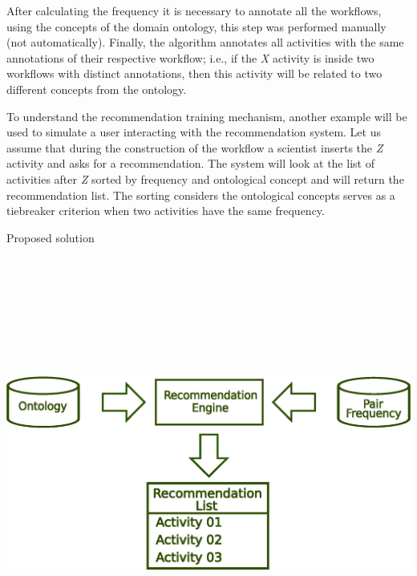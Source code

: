 \documentclass[a0, portrait]{a0poster}
\begin{document}
\begin{multicols}{2}
After calculating the frequency it is necessary to annotate all the workflows, using the concepts of the domain ontology, this step was performed manually (not automatically). Finally, the algorithm annotates all activities with the same annotations of their respective workflow; i.e., if the \emph{X} activity is inside two workflows with distinct annotations, then this activity will be related to two different concepts from the ontology. 

To understand the recommendation training mechanism, another example will be used to simulate a user interacting with the recommendation system. Let us assume that during the construction of the workflow a scientist inserts the \emph{Z} activity and asks for a recommendation. The system will look at the list of activities after \emph{Z} sorted by frequency and ontological concept and will return the recommendation list. The sorting considers the ontological concepts serves as a tiebreaker criterion when two activities have the same frequency.
\vspace{0.25cm}
\begin{center}
\large  \color{darkgreen} Proposed solution \\
\vspace{0.25cm}
\includegraphics[height=15cm, width=28cm]{novos/engineVerdeForte.eps}
\end{center}
\vspace{0.25cm}


\end{multicols}
\end{document}
